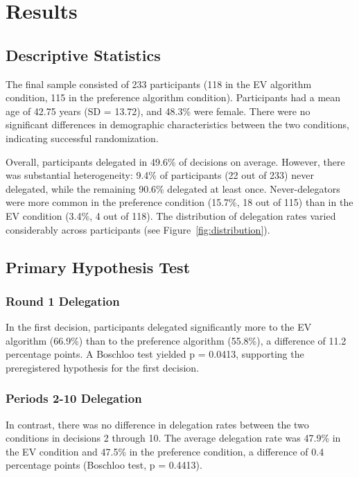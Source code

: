 \section{Results}

\subsection{Descriptive Statistics}

The final sample consisted of 233 participants (118 in the EV algorithm condition, 115 in the preference algorithm condition). Participants had a mean age of 42.75 years (SD = 13.72), and 48.3\% were female. There were no significant differences in demographic characteristics between the two conditions, indicating successful randomization.

Overall, participants delegated in 49.6\% of decisions on average. However, there was substantial heterogeneity: 9.4\% of participants (22 out of 233) never delegated, while the remaining 90.6\% delegated at least once. Never-delegators were more common in the preference condition (15.7\%, 18 out of 115) than in the EV condition (3.4\%, 4 out of 118). The distribution of delegation rates varied considerably across participants (see Figure~\ref{fig:distribution}).

\subsection{Primary Hypothesis Test}

\subsubsection{Round 1 Delegation}

In the first decision, participants delegated significantly more to the EV algorithm (66.9\%) than to the preference algorithm (55.8\%), a difference of 11.2 percentage points. A Boschloo test yielded p = 0.0413, supporting the preregistered hypothesis for the first decision.

\subsubsection{Periods 2-10 Delegation}

In contrast, there was no difference in delegation rates between the two conditions in decisions 2 through 10. The average delegation rate was 47.9\% in the EV condition and 47.5\% in the preference condition, a difference of 0.4 percentage points (Boschloo test, p = 0.4413).

